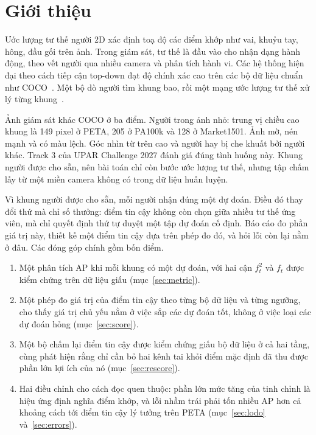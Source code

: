 \documentclass[11pt,a4paper]{article}
\begin{document}
\section{Giới thiệu}

Ước lượng tư thế người 2D xác định toạ độ các điểm khớp như vai, khuỷu tay, hông, đầu gối trên ảnh. Trong giám sát, tư thế là đầu vào cho nhận dạng hành động, theo vết người qua nhiều camera và phân tích hành vi. Các hệ thống hiện đại theo cách tiếp cận top-down đạt độ chính xác cao trên các bộ dữ liệu chuẩn như COCO~\cite{coco}. Một bộ dò người tìm khung bao, rồi một mạng ước lượng tư thế xử lý từng khung~\cite{simplebaseline,hrnet,vitpose}.

Ảnh giám sát khác COCO ở ba điểm. Người trong ảnh nhỏ: trung vị chiều cao khung là 149 pixel ở PETA, 205 ở PA100k và 128 ở Market1501. Ảnh mờ, nén mạnh và có màu lệch. Góc nhìn từ trên cao và người hay bị che khuất bởi người khác. Track 3 của UPAR Challenge 2027 đánh giá đúng tình huống này. Khung người được cho sẵn, nên bài toán chỉ còn bước ước lượng tư thế, nhưng tập chấm lấy từ một miền camera không có trong dữ liệu huấn luyện.

Vì khung người được cho sẵn, mỗi người nhận đúng một dự đoán. Điều đó thay đổi thứ mà chỉ số thưởng: điểm tin cậy không còn chọn giữa nhiều tư thế ứng viên, mà chỉ quyết định thứ tự duyệt một tập dự đoán cố định. Báo cáo đo phần giá trị này, thiết kế một điểm tin cậy dựa trên phép đo đó, và hỏi lỗi còn lại nằm ở đâu. Các đóng góp chính gồm bốn điểm.

\begin{enumerate}[leftmargin=1.4em]
\item Một phân tích AP khi mỗi khung có một dự đoán, với hai cận $f_t^2$ và $f_t$ được kiểm chứng trên dữ liệu giấu (mục~\ref{sec:metric}).
\item Một phép đo giá trị của điểm tin cậy theo từng bộ dữ liệu và từng ngưỡng, cho thấy giá trị chủ yếu nằm ở việc sắp các dự đoán tốt, không ở việc loại các dự đoán hỏng (mục~\ref{sec:score}).
\item Một bộ chấm lại điểm tin cậy được kiểm chứng giấu bộ dữ liệu ở cả hai tầng, cùng phát hiện rằng chỉ cần bỏ hai kênh tai khỏi điểm mặc định đã thu được phần lớn lợi ích của nó (mục~\ref{sec:rescore}).
\item Hai điều chỉnh cho cách đọc quen thuộc: phần lớn mức tăng của tinh chỉnh là hiệu ứng định nghĩa điểm khớp, và lỗi nhầm trái phải tốn nhiều AP hơn cả khoảng cách tới điểm tin cậy lý tưởng trên PETA (mục~\ref{sec:lodo} và~\ref{sec:errors}).
\end{enumerate}
\end{document}
